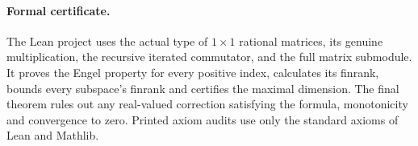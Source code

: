 \documentclass[11pt]{article}
\begin{document}
\paragraph{Formal certificate.}
The Lean project uses the actual type of $1\times1$ rational matrices,
its genuine multiplication, the recursive iterated commutator, and
the full matrix submodule. It proves the Engel property for every
positive index, calculates its finrank, bounds every subspace's
finrank and certifies the maximal dimension. The final theorem
rules out any real-valued correction satisfying the formula,
monotonicity and convergence to zero. Printed axiom audits use
only the standard axioms of Lean and Mathlib.
\end{document}
